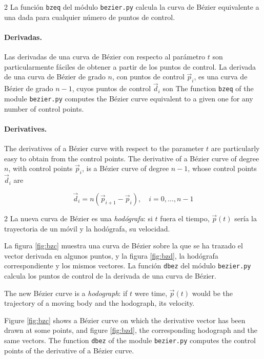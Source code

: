 \begin{paracol}{2}
La función \texttt{bzeq} del módulo \texttt{bezier.py} calcula la curva de Bézier equivalente a una dada para cualquier número de puntos de control. 

\paragraph{Derivadas.} Las derivadas de una curva de Bézier con respecto al parámetro $t$ son particularmente fáciles de obtener a partir de los puntos de control. La derivada de una curva de Bézier de grado $n$, con puntos de control $\vec{p}_i$, es una curva de Bézier de grado $n-1$, cuyos puntos de control $\vec{d}_i$ son
\switchcolumn
The function \texttt{bzeq} of the module \texttt{bezier.py} computes the Bézier curve equivalent to a given one for any number of control points. 

\paragraph{Derivatives.} The derivatives of a Bézier curve with respect to the parameter $t$ are particularly easy to obtain from the control points. The derivative of a Bézier curve of degree $n$, with control points $\vec{p}_i$, is a Bézier curve of degree $n-1$, whose control points $\vec{d}_i$ are
\end{paracol}

\begin{equation*}
\vec{d}_i = n\left(\vec{p}_{i+1} -\vec{p}_i\right), \quad i=0,\dots,n-1
\end{equation*}
\begin{paracol}{2}
La nueva curva de Bézier es una \emph{hodógrafa}: si $t$ fuera el tiempo, $\vec{p}(t)$ sería la trayectoria de un móvil y la hodógrafa, su velocidad. 

La figura \ref{fig:bzc} muestra una curva de Bézier sobre la que se ha trazado el vector derivada en algunos puntos, y la figura \ref{fig:bzd}, la hodógrafa correspondiente y los mismos vectores. La función \texttt{dbez} del módulo \texttt{bezier.py} calcula los puntos de control de la derivada de una curva de Bézier.

\switchcolumn
The new Bézier curve is a \emph{hodograph}: if $t$ were time, $\vec{p}(t)$ would be the trajectory of a moving body and the hodograph, its velocity. 

Figure \ref{fig:bzc} shows a Bézier curve on which the derivative vector has been drawn at some points, and figure \ref{fig:bzd}, the corresponding hodograph and the same vectors. The function \texttt{dbez} of the module \texttt{bezier.py} computes the control points of the derivative of a Bézier curve.
\end{paracol}

